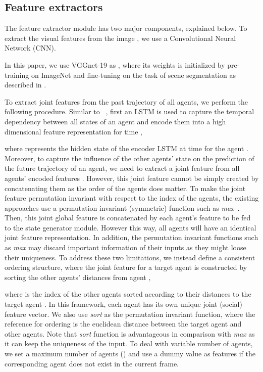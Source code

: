 \documentclass[10pt,twocolumn,letterpaper]{article}
\begin{document}
\subsection{Feature extractors}

The feature extractor module has two major components, explained below.
To extract the visual features  from the image , we use a Convolutional Neural Network (CNN).

In this paper, we use VGGnet-19 \cite{simonyan2014very} as , where its weights  is initialized by pre-training on ImageNet \cite{russakovsky2015imagenet} and fine-tuning on the task of scene segmentation as described in \cite{long2015fully}.

To extract joint features from the past trajectory of all agents, we perform the following procedure. Similar to ~\cite{gupta2018social}, first an LSTM is used to capture the temporal dependency between all states of an agent  and encode them into a high dimensional feature representation for time , \ie

where  represents the hidden state of the encoder LSTM at time  for the agent .
Moreover, to capture the influence of the other agents' state on the prediction of the future trajectory of an agent, we need to extract a joint feature from all agents' encoded features . However, this joint feature cannot be simply created by concatenating them as the order of the agents does matter. To make the joint feature permutation invariant with respect to the index of the agents, the existing approaches use a permutation invariant (symmetric) function such as \emph{max}~\cite{gupta2018social}. Then, this joint global feature is concatenated by each agent's feature  to be fed to the state generator module. However this way, all agents will have an identical joint feature representation. In addition, the permutation invariant functions such as \emph{max} may discard important information of their inputs as they might loose their uniqueness. To address these two limitations, we instead define a consistent ordering structure, where the joint feature for a target agent  is constructed by sorting the other agents' distances from agent , \ie

where  is the index of the other agents sorted according to their distances to the target agent . In this framework, each agent  has its own unique joint (social) feature vector. We also use \emph{sort} as the permutation invariant function, where the reference for ordering is the euclidean distance between the target agent  and other agents. Note that \emph{sort} function is advantageous in comparison with \emph{max} as it can keep the uniqueness of the input.    
To deal with variable number of agents, we set a maximum number of agents () and use a dummy value as features if the corresponding agent does not exist in the current frame. 
\end{document}
